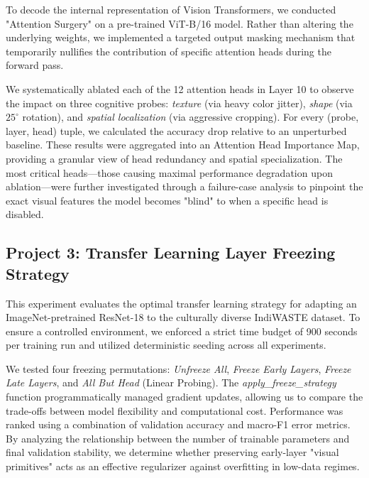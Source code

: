 \documentclass[12pt,a4paper]{article}
\begin{document}
To decode the internal representation of Vision Transformers, we conducted "Attention Surgery" on a pre-trained ViT-B/16 model. Rather than altering the underlying weights, we implemented a targeted output masking mechanism that temporarily nullifies the contribution of specific attention heads during the forward pass.

We systematically ablated each of the 12 attention heads in Layer 10 to observe the impact on three cognitive probes: \textit{texture} (via heavy color jitter), \textit{shape} (via $25^{\circ}$ rotation), and \textit{spatial localization} (via aggressive cropping). For every (probe, layer, head) tuple, we calculated the accuracy drop relative to an unperturbed baseline. These results were aggregated into an Attention Head Importance Map, providing a granular view of head redundancy and spatial specialization. The most critical heads—those causing maximal performance degradation upon ablation—were further investigated through a failure-case analysis to pinpoint the exact visual features the model becomes "blind" to when a specific head is disabled.

\vspace{1em}

\subsection{Project 3: Transfer Learning Layer Freezing Strategy}

This experiment evaluates the optimal transfer learning strategy for adapting an ImageNet-pretrained ResNet-18 to the culturally diverse IndiWASTE dataset. To ensure a controlled environment, we enforced a strict time budget of 900 seconds per training run and utilized deterministic seeding across all experiments.

We tested four freezing permutations: \textit{Unfreeze All}, \textit{Freeze Early Layers}, \textit{Freeze Late Layers}, and \textit{All But Head} (Linear Probing). The \textit{apply\_freeze\_strategy} function programmatically managed gradient updates, allowing us to compare the trade-offs between model flexibility and computational cost. Performance was ranked using a combination of validation accuracy and macro-F1 error metrics. By analyzing the relationship between the number of trainable parameters and final validation stability, we determine whether preserving early-layer "visual primitives" acts as an effective regularizer against overfitting in low-data regimes.

\vspace{2em}
\end{document}
